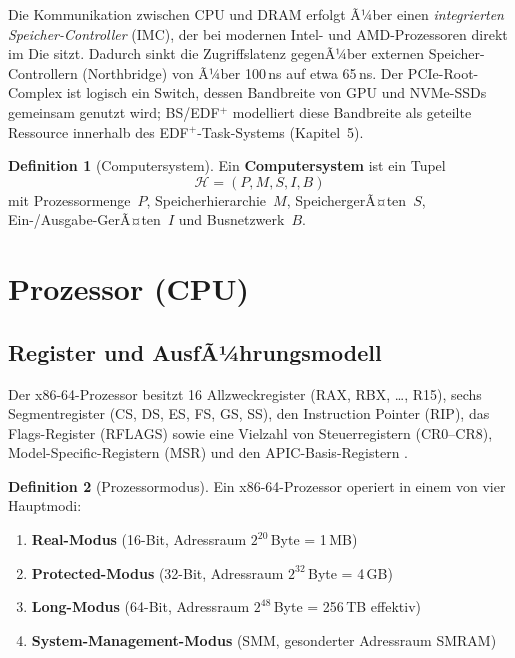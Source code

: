 ﻿\documentclass[a4paper,12pt]{scrreprt}
\theoremstyle{definition}
\newtheorem{definition}{Definition}[chapter]
\begin{document}
	Die Kommunikation zwischen CPU und DRAM erfolgt Ã¼ber einen
	\emph{integrierten Speicher-Controller} (IMC), der bei modernen Intel- und
	AMD-Prozessoren direkt im Die sitzt. Dadurch sinkt die Zugriffslatenz gegenÃ¼ber
	externen Speicher-Controllern (Northbridge) von Ã¼ber 100\,ns auf etwa 65\,ns.
	Der PCIe-Root-Complex ist logisch ein Switch, dessen Bandbreite von GPU und
	NVMe-SSDs gemeinsam genutzt wird; BS/EDF$^+$ modelliert diese Bandbreite
	als geteilte Ressource innerhalb des EDF$^+$-Task-Systems (Kapitel~5).

	\begin{definition}[Computersystem]
		Ein \textbf{Computersystem} ist ein Tupel
		\[
		\mathcal{H} = (P, M, S, I, B)
		\]
		mit Prozessormenge~$P$, Speicherhierarchie~$M$, SpeichergerÃ¤ten~$S$,
		Ein-/Ausgabe-GerÃ¤ten~$I$ und Busnetzwerk~$B$.
	\end{definition}
	
	\section{Prozessor (CPU)}
	
	\subsection{Register und AusfÃ¼hrungsmodell}
	
	Der x86-64-Prozessor besitzt 16 Allzweckregister (RAX, RBX, \ldots{}, R15),
	sechs Segmentregister (CS, DS, ES, FS, GS, SS), den Instruction Pointer (RIP),
	das Flags-Register (RFLAGS) sowie eine Vielzahl von Steuerregistern (CR0--CR8),
	Model-Specific-Registern (MSR) und den APIC-Basis-Registern \cite{Intel2023}.
	
	\begin{definition}[Prozessormodus]
		Ein x86-64-Prozessor operiert in einem von vier Hauptmodi:
		\begin{enumerate}
			\item \textbf{Real-Modus} (16-Bit, Adressraum $2^{20}$\,Byte = 1\,MB)
			\item \textbf{Protected-Modus} (32-Bit, Adressraum $2^{32}$\,Byte = 4\,GB)
			\item \textbf{Long-Modus} (64-Bit, Adressraum $2^{48}$\,Byte = 256\,TB effektiv)
			\item \textbf{System-Management-Modus} (SMM, gesonderter Adressraum SMRAM)
		\end{enumerate}
	\end{definition}
	
\end{document}
